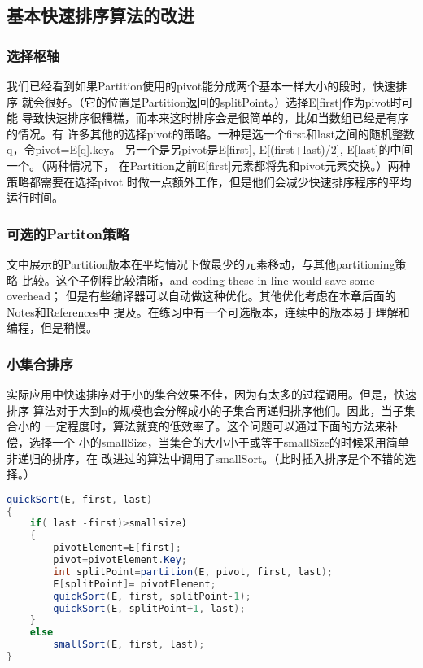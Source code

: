\subsection{基本快速排序算法的改进}\label{Sec:ImprovementsOntheBasicQuicksortAlgorithm}
\subsubsection{选择枢轴}
我们已经看到如果Partition使用的pivot能分成两个基本一样大小的段时，快速排序
就会很好。（它的位置是Partition返回的splitPoint。）选择E[first]作为pivot时可能
导致快速排序很糟糕，而本来这时排序会是很简单的，比如当数组已经是有序的情况。有
许多其他的选择pivot的策略。一种是选一个first和last之间的随机整数q，令pivot=E[q].key。
另一个是另pivot是E[first], E[(first+last)/2], E[last]的中间一个。（两种情况下，
在Partition之前E[first]元素都将先和pivot元素交换。）两种策略都需要在选择pivot
时做一点额外工作，但是他们会减少快速排序程序的平均运行时间。

\subsubsection{可选的Partiton策略}
文中展示的Partition版本在平均情况下做最少的元素移动，与其他partitioning策略
比较。这个子例程比较清晰，and coding these in-line would save some overhead；
但是有些编译器可以自动做这种优化。其他优化考虑在本章后面的Notes和References中
提及。在练习中有一个可选版本，连续中的版本易于理解和编程，但是稍慢。

\subsubsection{小集合排序}
实际应用中快速排序对于小的集合效果不佳，因为有太多的过程调用。但是，快速排序
算法对于大到n的规模也会分解成小的子集合再递归排序他们。因此，当子集合小的
一定程度时，算法就变的低效率了。这个问题可以通过下面的方法来补偿，选择一个
小的smallSize，当集合的大小小于或等于smallSize的时候采用简单非递归的排序，在
改进过的算法中调用了smallSort。（此时插入排序是个不错的选择。）

\begin{lstlisting}[language={Java}, keywordstyle=\color{blue!70}, commentstyle=\color{red!50!green!50!blue!50}]
quickSort(E, first, last)
{
    if( last -first)>smallsize)
    {
        pivotElement=E[first];
        pivot=pivotElement.Key;
        int splitPoint=partition(E, pivot, first, last);
        E[splitPoint]= pivotElement;
        quickSort(E, first, splitPoint-1);
        quickSort(E, splitPoint+1, last);
    }
    else
        smallSort(E, first, last);
}
\end{lstlisting}

